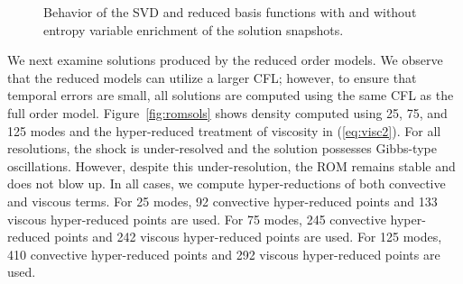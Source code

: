 \documentclass[preprint,10pt]{elsarticle}
\theoremstyle{definition}
\theoremstyle{lemma}
\theoremstyle{theorem}
\theoremstyle{assumption}
\begin{document}
\begin{figure}
\centering
{}
\hspace{.02em}
\hspace{.02em}
\caption{Behavior of the SVD and reduced basis functions with and without entropy variable enrichment of the solution snapshots. }
\label{fig:svd}
\end{figure}

We next examine solutions produced by the reduced order models.  We observe that the reduced models can utilize a larger CFL; however, to ensure that temporal errors are small, all solutions are computed using the same CFL as the full order model.  Figure~\ref{fig:romsols} shows density computed using 25, 75, and 125 modes and the hyper-reduced treatment of viscosity in (\ref{eq:visc2}).  For all resolutions, the shock is under-resolved and the solution possesses Gibbs-type oscillations.  However, despite this under-resolution, the ROM remains stable and does not blow up.  In all cases, we compute hyper-reductions of both convective and viscous terms.  For 25 modes, 92 convective hyper-reduced points and 133 viscous hyper-reduced points are used.  For 75 modes, 245 convective hyper-reduced points and 242 viscous hyper-reduced points are used.  For 125 modes, 410 convective hyper-reduced points and 292 viscous hyper-reduced points are used.  
\end{document}
